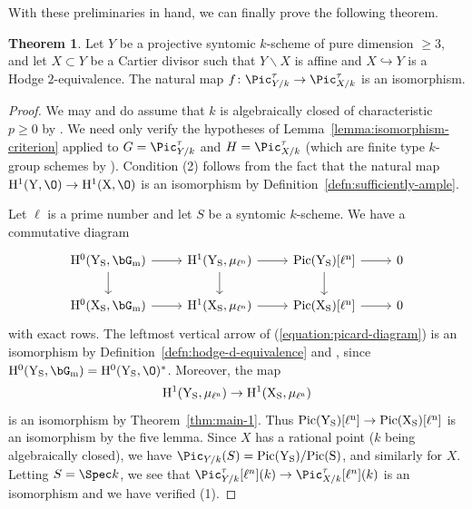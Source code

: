 \documentclass[11pt,reqno]{amsart}
\numberwithin{equation}{section}
\theoremstyle{definition}
\newtheorem{thm}{Theorem}[subsection]
\begin{document}
With these preliminaries in hand, we can finally prove the following theorem.

\begin{thm}\label{thm:SGA7-suff-ample}
Let $Y$ be a projective syntomic $k$-scheme of pure dimension $\geq 3$, and let $X \subset Y$ be a Cartier divisor such that $Y\smallsetminus X$ is affine and $X \hookrightarrow Y$ is a Hodge $2$-equivalence. The natural map $f\colon\Pic^\tau_{Y/k} \to \Pic^\tau_{X/k}$ is an isomorphism.
\end{thm}

\begin{proof}
We may and do assume that $k$ is algebraically closed of characteristic $p \geq 0$ by \cite[Prop.\ 5.10]{ABM}. We need only verify the hypotheses of Lemma~\ref{lemma:isomorphism-criterion} applied to $G = \Pic^\tau_{Y/k}$ and $H = \Pic^\tau_{X/k}$ (which are finite type $k$-group schemes by \cite[Exp.\ XII, Cor.\ 1.5;  Exp.\ XIII, Thm.\ 4.7(iii)]{SGA6}). Condition (2) follows from the fact that the natural map $\rm{H}^1(Y, \O) \to \rm{H}^1(X, \O)$ is an isomorphism by Definition~\ref{defn:sufficiently-ample}.\smallskip

Let $\ell$ is a prime number and let $S$ be a syntomic $k$-scheme. We have a commutative diagram 
\begin{equation}\label{equation:picard-diagram}
\begin{tikzcd}
\rm{H}^0(Y_S, \bG_m) \arrow[r] \arrow[d]
    &\rm{H}^1(Y_S, \mu_{\ell^n}) \arrow[r] \arrow[d]
    &\rm{Pic}(Y_S)[\ell^n] \arrow[r] \arrow[d]
    &0 \\
\rm{H}^0(X_S, \bG_m) \arrow[r]
    &\rm{H}^1(X_S, \mu_{\ell^n}) \arrow[r]
    &\rm{Pic}(X_S)[\ell^n] \arrow[r]
    &0
\end{tikzcd}
\end{equation}
with exact rows. The leftmost vertical arrow of (\ref{equation:picard-diagram}) is an isomorphism by Definition~\ref{defn:hodge-d-equivalence} and \cite[Prop.\ 5.10]{ABM}, since $\rm{H}^0(Y_S, \bG_m) = \rm{H}^0(Y_S, \O)^*$. Moreover, the map
\[
\rm{H}^1(Y_S, \mu_{\ell^n}) \to \rm{H}^1(X_S, \mu_{\ell^n})
\]
is an isomorphism by Theorem~\ref{thm:main-1}. Thus $\rm{Pic}(Y_S)[\ell^n] \to \rm{Pic}(X_S)[\ell^n]$ is an isomorphism by the five lemma. Since $X$ has a rational point ($k$ being algebraically closed), we have $\Pic_{Y/k}(S) = \rm{Pic}(Y_S)/\rm{Pic}(S)$, and similarly for $X$. Letting $S = \Spec k$, we see that $\Pic^\tau_{Y/k}[\ell^n](k) \to \Pic^\tau_{X/k}[\ell^n](k)$ is an isomorphism and we have verified (1).\smallskip


\end{proof}
\end{document}
